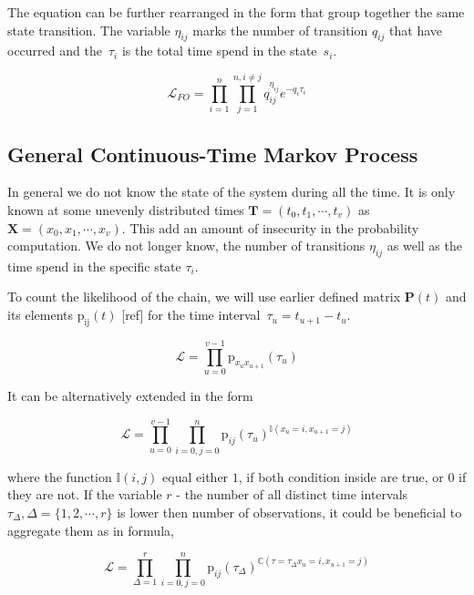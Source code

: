\documentclass[thesis=M,english]{FITthesis}[2012/10/20]
\newcommand{\matr}[1]{\mathbf{#1}}
\begin{document}
The equation can be further rearranged in the form that group together the same state transition. The variable $\eta_{ij}$ marks the number of transition $q_{ij}$ that have occurred and the~$\tau_i$ is the total time spend in the state~$s_i$.

\begin{equation}\label{eq:CL2}
 \mathcal{L}_{FO} = \prod_{i=1}^{n} \prod_{j=1}^{n, i \neq j} q_{ij}^{\eta_{ij} } e^{ - q_i \tau_i }
\end{equation}

\subsection{ General Continuous-Time Markov Process }

In general we do not know the state of the system during all the time. It is only known at some unevenly distributed times $\matr{T} = ( t_0, t_1, \cdots, t_{v} )$ as $\matr{X}= (x_0, x_1, \cdots, x_{v} )$. 
This add an amount of insecurity in the probability computation. We do not longer know, the number of transitions $\eta_{ij}$ as well as the time spend in the specific state $\tau_i$. 

To count the likelihood of the chain, we will use earlier defined matrix $\matr{P}(t)$ and its elements $\mathrm{p_{ij}}(t)$ [ref] for the time interval~$\tau_u = t_{u+1} - t_u$.    

\begin{equation}
 \mathcal{L} = \prod_{u=0}^{v-1} \mathrm{p}_{x_u x_{u+1}}(\tau_u) 
\end{equation}

It can be alternatively extended in the form

\begin{equation}
 \mathcal{L} = \prod_{u=0}^{v-1} \prod_{i=0,j=0}^{n}  \mathrm{p}_{ij}(\tau_u)^{\mathbb{I}( x_u = i, x_{u+1} = j )} 
\end{equation}

where the function $\mathbb{I}(i,j)$ equal either $1$, if both condition inside are true, or $0$ if they are not. 
If the variable $r$ - the number of all distinct time intervals $\tau_{\Delta}, \Delta =\{1,2,\cdots,r\}$ is lower then number of observations, it could be beneficial to aggregate them as in formula,

\begin{equation}\label{eq:CTL}
 \mathcal{L} = \prod_{\Delta = 1}^{r} \prod_{i=0,j=0}^{n}  \mathrm{p}_{ij}(\tau_{\Delta})^{\mathbb{C}( \tau=\tau_{\Delta} x_u = i, x_{u+1} = j )} 
\end{equation}
\end{document}
